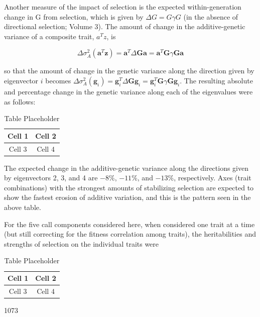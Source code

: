 \documentclass{article}
\begin{document}
Another measure of the impact of selection is the expected within-generation change in G from selection, which is given by  $ \Delta G = G \gamma G $ (in the absence of directional selection; Volume 3). The amount of change in the additive-genetic variance of a composite trait,  $ a^T z $, is

\begin{equation}
\Delta\sigma_{A}^{2}(\mathbf{a}^{T}\mathbf{z})=\mathbf{a}^{T}\Delta\mathbf{G}\mathbf{a}=\mathbf{a}^{T}\mathbf{G}\gamma\mathbf{G}\mathbf{a}
\end{equation}

so that the amount of change in the genetic variance along the direction given by eigenvector $i$ becomes $\Delta\sigma_A^2(\mathbf{g}_i) = \mathbf{g}_i^T \Delta\mathbf{G}\mathbf{g}_i = \mathbf{g}_i^T \mathbf{G} \gamma \mathbf{G}\mathbf{g}_i$. The resulting absolute and percentage change in the genetic variance along each of the eigenvalues were as follows:

\begin{table}[h]
\centering
\begin{tabular}{|c|c|}
\hline
Cell 1 & Cell 2 \\
\hline
Cell 3 & Cell 4 \\
\hline
\end{tabular}
\caption{Table Placeholder}
\end{table}

The expected change in the additive-genetic variance along the directions given by eigenvectors 2, 3, and 4 are  $ -8\% $,  $ -11\% $, and  $ -13\% $, respectively. Axes (trait combinations) with the strongest amounts of stabilizing selection are expected to show the fastest erosion of additive variation, and this is the pattern seen in the above table.

For the five call components considered here, when considered one trait at a time (but still correcting for the fitness correlation among traits), the heritabilities and strengths of selection on the individual traits were

\begin{table}[h]
\centering
\begin{tabular}{|c|c|}
\hline
Cell 1 & Cell 2 \\
\hline
Cell 3 & Cell 4 \\
\hline
\end{tabular}
\caption{Table Placeholder}
\end{table}

1073
\end{document}
